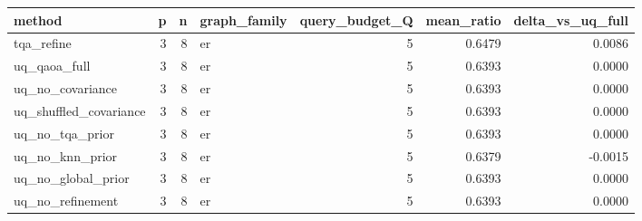 \begin{tabular}{lrrlrrr}
\toprule
method & p & n & graph_family & query_budget_Q & mean_ratio & delta_vs_uq_full \\
\midrule
tqa_refine & 3 & 8 & er & 5 & 0.6479 & 0.0086 \\
uq_qaoa_full & 3 & 8 & er & 5 & 0.6393 & 0.0000 \\
uq_no_covariance & 3 & 8 & er & 5 & 0.6393 & 0.0000 \\
uq_shuffled_covariance & 3 & 8 & er & 5 & 0.6393 & 0.0000 \\
uq_no_tqa_prior & 3 & 8 & er & 5 & 0.6393 & 0.0000 \\
uq_no_knn_prior & 3 & 8 & er & 5 & 0.6379 & -0.0015 \\
uq_no_global_prior & 3 & 8 & er & 5 & 0.6393 & 0.0000 \\
uq_no_refinement & 3 & 8 & er & 5 & 0.6393 & 0.0000 \\
\bottomrule
\end{tabular}
